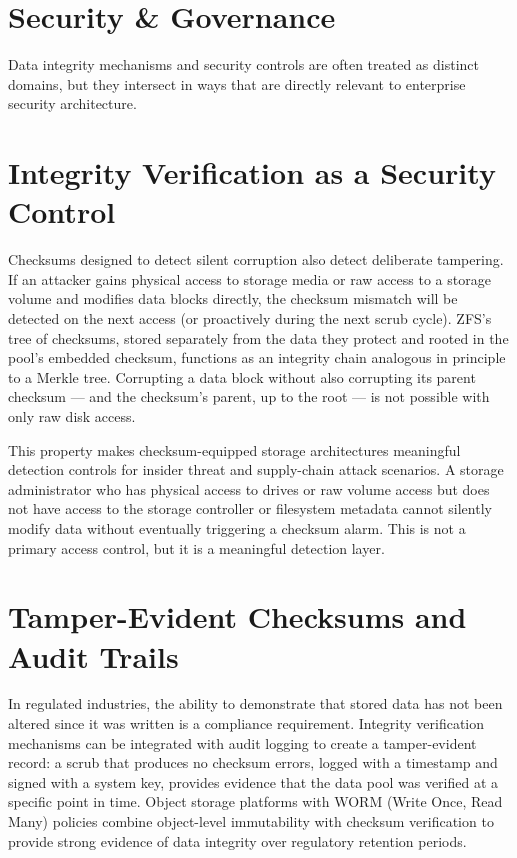 \section{Security \& Governance}
Data integrity mechanisms and security controls are often treated as distinct domains, but they intersect in ways that are directly relevant to enterprise security architecture.

\section{Integrity Verification as a Security Control}
Checksums designed to detect silent corruption also detect deliberate tampering. If an attacker gains physical access to storage media or raw access to a storage volume and modifies data blocks directly, the checksum mismatch will be detected on the next access (or proactively during the next scrub cycle). ZFS's tree of checksums, stored separately from the data they protect and rooted in the pool's embedded checksum, functions as an integrity chain analogous in principle to a Merkle tree. Corrupting a data block without also corrupting its parent checksum --- and the checksum's parent, up to the root --- is not possible with only raw disk access.

This property makes checksum-equipped storage architectures meaningful detection controls for insider threat and supply-chain attack scenarios. A storage administrator who has physical access to drives or raw volume access but does not have access to the storage controller or filesystem metadata cannot silently modify data without eventually triggering a checksum alarm. This is not a primary access control, but it is a meaningful detection layer.

\section{Tamper-Evident Checksums and Audit Trails}
In regulated industries, the ability to demonstrate that stored data has not been altered since it was written is a compliance requirement. Integrity verification mechanisms can be integrated with audit logging to create a tamper-evident record: a scrub that produces no checksum errors, logged with a timestamp and signed with a system key, provides evidence that the data pool was verified at a specific point in time. Object storage platforms with WORM (Write Once, Read Many) policies combine object-level immutability with checksum verification to provide strong evidence of data integrity over regulatory retention periods.

